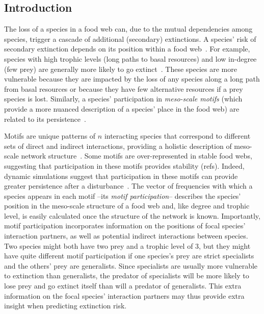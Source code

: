 \documentclass[12pt]{article}
\begin{document}
\clearpage
\begin{spacing}{2.0}

\section*{Introduction} %

    The loss of a species in a food web can, due to the mutual dependencies among species,  trigger a cascade of additional (secondary) extinctions. 
    A species' risk of secondary extinction depends on its position within a food web~\citep{Santos2021,curtsdotter2011robustness, dunne2009cascading, Eklof2006}.
    For example, species with high trophic levels (long paths to basal resources) and low in-degree (few prey) are generally more likely to go extinct~\citep{Allesina2012,binzer2011susceptibility, Eklof2006}.
    These species are more vulnerable because they are impacted by the loss of any species along a long path from basal resources or because they have few alternative resources if a prey species is lost.
    Similarly, a species' participation in \emph{meso-scale motifs} (which provide a more nuanced description of a species' place in the food web) are related to its persistence~\citep{Cirtwill2015a,Cirtwill2018FoodWebs,Cirtwill2022Oikos}.
    
    
    Motifs are unique patterns of $n$ interacting species that correspond to different sets of direct and indirect interactions, providing a holistic description of meso-scale network structure~\citep{Stouffer2007,Stouffer2012}.
    Some motifs are over-represented in stable food webs, suggesting that participation in these motifs provides stability (refs).
    Indeed, dynamic simulations suggest that participation in these motifs can provide greater persistence after a disturbance~\citep{Cirtwill2022Oikos}.
    The vector of frequencies with which a species appears in each motif --its \emph{motif participation}-- describes the species' position in the meso-scale structure of a food web and, like degree and trophic level, is easily calculated once the structure of the network is known.
    Importantly, motif participation incorporates information on the positions of focal species' interaction partners, as well as potential indirect interactions between species.
    Two species might both have two prey and a trophic level of 3, but they might have quite different motif participation if one species's prey are strict specialists and the others' prey are generalists.
    Since specialists are usually more vulnerable to extinction than generalists, the predator of specialists will be more likely to lose prey and go extinct itself than will a predator of generalists.
    This extra information on the focal species' interaction partners may thus provide extra insight when predicting extinction risk.
    

\end{spacing}
\end{document}
